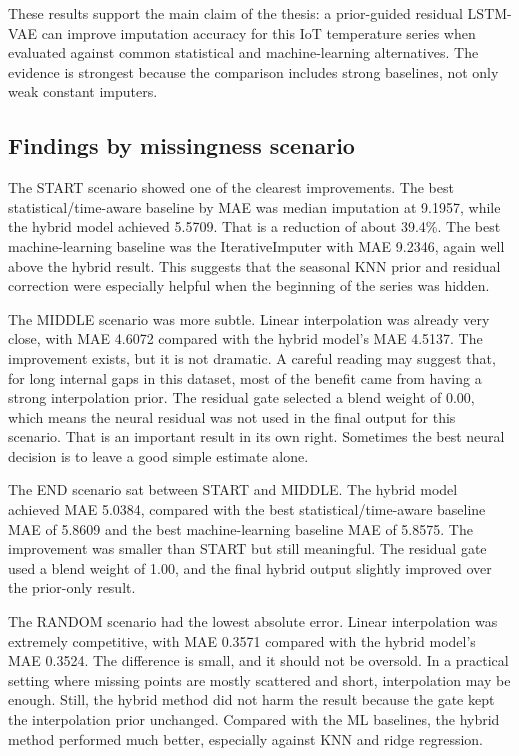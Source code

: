 These results support the main claim of the thesis: a prior-guided residual LSTM-VAE can improve imputation accuracy for this IoT temperature series when evaluated against common statistical and machine-learning alternatives. The evidence is strongest because the comparison includes strong baselines, not only weak constant imputers.

\subsection{Findings by missingness scenario}

The START scenario showed one of the clearest improvements. The best statistical/time-aware baseline by MAE was median imputation at 9.1957, while the hybrid model achieved 5.5709. That is a reduction of about 39.4\%. The best machine-learning baseline was the IterativeImputer with MAE 9.2346, again well above the hybrid result. This suggests that the seasonal KNN prior and residual correction were especially helpful when the beginning of the series was hidden.

The MIDDLE scenario was more subtle. Linear interpolation was already very close, with MAE 4.6072 compared with the hybrid model's MAE 4.5137. The improvement exists, but it is not dramatic. A careful reading may suggest that, for long internal gaps in this dataset, most of the benefit came from having a strong interpolation prior. The residual gate selected a blend weight of 0.00, which means the neural residual was not used in the final output for this scenario. That is an important result in its own right. Sometimes the best neural decision is to leave a good simple estimate alone.

The END scenario sat between START and MIDDLE. The hybrid model achieved MAE 5.0384, compared with the best statistical/time-aware baseline MAE of 5.8609 and the best machine-learning baseline MAE of 5.8575. The improvement was smaller than START but still meaningful. The residual gate used a blend weight of 1.00, and the final hybrid output slightly improved over the prior-only result.

The RANDOM scenario had the lowest absolute error. Linear interpolation was extremely competitive, with MAE 0.3571 compared with the hybrid model's MAE 0.3524. The difference is small, and it should not be oversold. In a practical setting where missing points are mostly scattered and short, interpolation may be enough. Still, the hybrid method did not harm the result because the gate kept the interpolation prior unchanged. Compared with the ML baselines, the hybrid method performed much better, especially against KNN and ridge regression.

